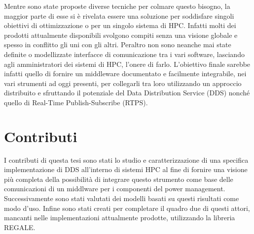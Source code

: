 Mentre sono state proposte diverse tecniche per colmare questo bisogno, %
la maggior parte di esse si è rivelata essere una soluzione per soddisfare singoli obiettivi di ottimizzazione o per un singolo sistema di HPC. Infatti molti dei prodotti attualmente disponibili svolgono compiti senza una visione globale e spesso in conflitto gli uni con gli altri. Peraltro non sono neanche mai state definite o modellizzate interfacce di comunicazione tra i vari software, lasciando agli amministratori dei sistemi di HPC, l'onere di farlo.
L'obiettivo finale sarebbe infatti quello di fornire un middleware documentato e facilmente integrabile, nei vari strumenti ad oggi presenti, per collegarli tra loro utilizzando un approccio distribuito e sfruttando il potenziale del Data Distribution Service (DDS) %
nonché quello di \gls{Real-Time} Publish-Subscribe (RTPS).

\section{Contributi}
I contributi di questa tesi sono stati lo studio e caratterizzazione di una specifica implementazione di DDS all'interno di sistemi HPC al fine di fornire una visione più completa della possibilità di integrare questo strumento come base delle comunicazioni di un middlware per i componenti del power management. Successivamente sono stati valutati dei modelli basati su questi risultati come modo d'uso. Infine sono stati creati per completare il quadro due di questi attori, mancanti nelle implementazioni attualmente prodotte, utilizzando la libreria REGALE.

